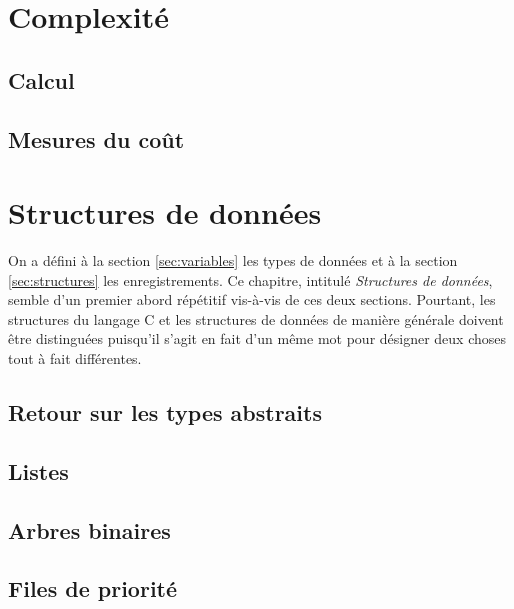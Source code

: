 \documentclass{minitelreport}
\begin{document}
\begin{refsection}
	\chapter{Complexité}
	\label{cha:complexite}
		\section{Calcul}
			\label{sec:calcul}
			
		\section{Mesures du coût} %
			\label{sec:mesures_du_cout}
			
	\chapter{Structures de données}
	\label{cha:structures_de_donn_es_classiques}
	On a défini à la section \ref{sec:variables} les types de données et à la section \ref{sec:structures} les enregistrements. Ce chapitre, intitulé \textit{Structures de données}, semble d'un premier abord répétitif vis-à-vis de ces deux sections. Pourtant, les structures du langage C et les structures de données de manière générale doivent être distinguées puisqu'il s'agit en fait d'un même mot pour désigner deux choses tout à fait différentes.
		\section{Retour sur les types abstraits} %
			\label{sec:type_abstrait_de_donn_es}
			
		\newpage
		\section{Listes}
			\label{sec:listes}
			
		\newpage
		\section{Arbres binaires}
			\label{sec:arbres_binaires}
			
		\newpage
		\section{Files de priorité}
			\label{sec:files_de_priorite}
			
		\newpage

\end{refsection}
\end{document}
